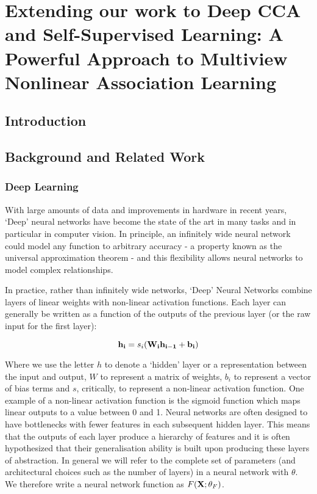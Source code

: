 \chapter{Extending our work to Deep CCA and Self-Supervised Learning: A Powerful Approach to Multiview Nonlinear Association Learning}
\label{Deep}

\section{Introduction}


\section{Background and Related Work}

\subsection{Deep Learning}

With large amounts of data and improvements in hardware in recent years, `Deep' neural networks have become the state of the art in many tasks and in particular in computer vision. In principle, an infinitely wide neural network could model any function to arbitrary accuracy - a property known as the universal approximation theorem - and this flexibility allows neural networks to model complex relationships. 

In practice, rather than infinitely wide networks, `Deep' Neural Networks combine layers of linear weights with non-linear activation functions. Each layer can generally be written as a function of the outputs of the previous layer (or the raw input for the first layer):

$$
\bold{h_i}=s_i(\bold{W_ih_{i-1}}+\bold{b_i})
$$

Where we use the letter $h$ to denote a `hidden' layer or a representation between the input and output, $W$ to represent a matrix of weights, $b_i$ to represent a vector of bias terms and $s$, critically, to represent a non-linear activation function. One example of a non-linear activation function is the sigmoid function which maps linear outputs to a value between 0 and 1. Neural networks are often designed to have bottlenecks with fewer features in each subsequent hidden layer. This means that the outputs of each layer produce a hierarchy of features and it is often hypothesized that their generalisation ability is built upon producing these layers of abstraction\cite{li2018survey}. In general we will refer to the complete set of parameters (and architectural choices such as the number of layers) in a neural network with $\theta$. We therefore write a neural network function as $F(\bold{X};\theta_F)$.

